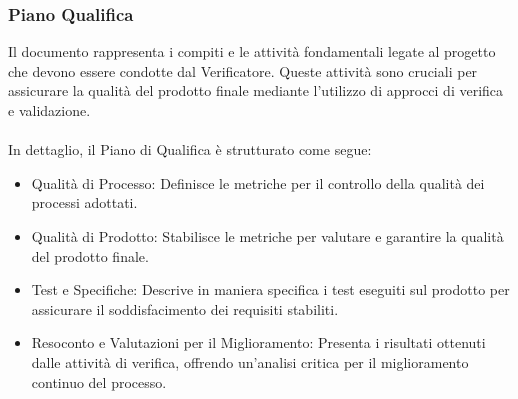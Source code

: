 \documentclass{article}
\begin{document}
\subsubsection{Piano Qualifica}
Il documento rappresenta i compiti e le attività fondamentali legate al progetto che devono essere condotte dal Verificatore. Queste attività sono cruciali per assicurare la qualità del prodotto finale mediante l'utilizzo di approcci di verifica e validazione.\\\\
In dettaglio, il Piano di Qualifica è strutturato come segue:
\begin{itemize}
    \item Qualità di Processo: Definisce le metriche per il controllo della qualità dei processi adottati.
    \item Qualità di Prodotto: Stabilisce le metriche per valutare e garantire la qualità del prodotto finale.
    \item Test e Specifiche: Descrive in maniera specifica i test eseguiti sul prodotto per assicurare il soddisfacimento dei requisiti stabiliti.
    \item Resoconto e Valutazioni per il Miglioramento: Presenta i risultati ottenuti dalle attività di verifica, offrendo un'analisi critica per il miglioramento continuo del processo.
\end{itemize}
\end{document}
